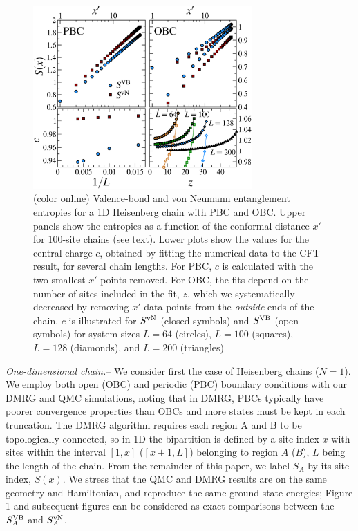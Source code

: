 \documentclass[prl,aps,twocolumn,floatfix,amsmath,amssymb,superscriptaddress,tightenlines]{revtex4}
\begin{document}
\begin{figure} {
\includegraphics[width=3.3in]{4-panelFIG1.eps} \caption{(color online) Valence-bond
and von Neumann entanglement entropies for a 1D Heisenberg chain with PBC and OBC. Upper panels show the entropies as a
function of the conformal distance $x'$ for 100-site chains (see text).
Lower plots show the values for the central charge $c$, obtained by
fitting the numerical data to the CFT result, for several chain lengths.
For PBC, $c$ is calculated with the two smallest $x'$ points removed.
For OBC, the fits depend on the number of sites included in the fit, $z$,
which we
systematically decreased by
removing $x'$ data points from the {\it outside} ends of the chain.
$c$ is illustrated for $S^{\rm vN}$ (closed symbols) and $S^{\rm VB}$ (open
symbols) for system sizes $L=64$ (circles), $L=100$ (squares), $L=128$
(diamonds), and $L=200$ (triangles) \label{1D}}} \end{figure}

{\it One-dimensional chain.}-- We consider first the case of Heisenberg
chains ($N=1$). We employ both open (OBC) and periodic (PBC) boundary conditions
with our DMRG and QMC simulations, noting that in DMRG, PBCs typically
have poorer convergence properties than OBCs and more states must be kept
in each truncation.  The DMRG algorithm requires each region A and B to
be topologically connected, so in 1D the bipartition is defined by a site
index $x$ with sites within the interval $[1,x]$ ($[x+1,L]$) belonging to
region $A$ ($B$), $L$ being the length of the chain.  From the
remainder of this paper, we label $S_A$ by its site index, $S(x)$.
We stress that the QMC and DMRG results are on the same geometry and
Hamiltonian, and reproduce the same ground state energies; Figure 1 and subsequent figures can be considered as exact comparisons between the $S^{\rm VB}_A$ and $S^{ \rm vN}_A$.
\end{document}
